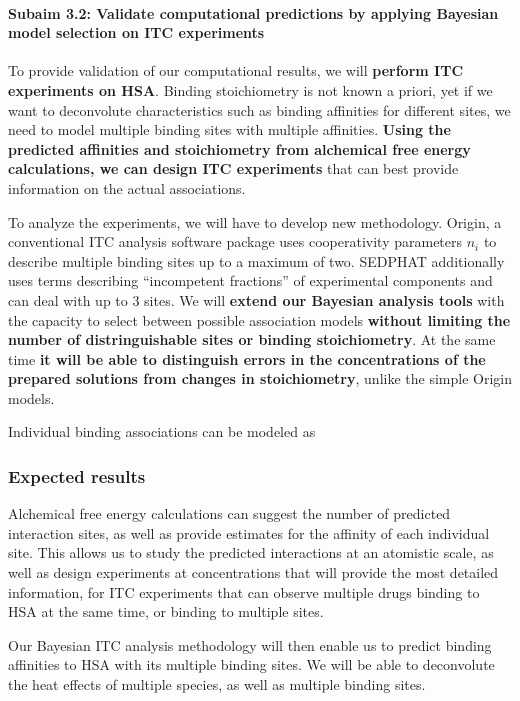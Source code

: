 \documentclass[10pt,final]{article}
\newcommand{\subsubsubsection}[1]{\paragraph*{#1}}
\begin{document}
\subsubsubsection{Subaim 3.2: Validate computational predictions by applying Bayesian model selection on ITC  experiments}
To provide validation of our computational results, we will \textbf{perform ITC experiments on HSA}. Binding stoichiometry is not known a priori, yet if we want to deconvolute characteristics such as binding affinities for different sites, we need to model multiple binding sites with multiple affinities. \textbf{Using the predicted affinities and stoichiometry from alchemical free energy calculations, we can design ITC experiments} that can best provide information on the actual associations. 

To analyze the experiments, we will have to develop new methodology. 
Origin, a conventional ITC analysis software package uses cooperativity parameters $n_i$ to describe multiple binding sites\cite{MicroCal2004a} up to a maximum of two. SEDPHAT additionally uses terms describing ``incompetent fractions'' of experimental components \cite{Houtman2007a,Zhao2015b} and can deal with up to 3 sites.
We will \textbf{extend our Bayesian analysis tools} with the capacity to select between possible association models \textbf{without limiting the number of distringuishable sites or binding stoichiometry}. At the same time \textbf{it will be able to distinguish errors in the concentrations of the prepared solutions from changes in stoichiometry}, unlike the simple Origin models. 

Individual binding associations can be modeled as

\subsubsection*{Expected results}
Alchemical free energy calculations can suggest the number of predicted interaction sites, as well as provide estimates for the affinity of each individual site.
This allows us to study the predicted interactions at an atomistic scale, as well as design experiments at concentrations that will provide the most detailed information, for ITC experiments that can observe multiple drugs binding to HSA at the same time, or binding to multiple sites.

Our Bayesian ITC analysis methodology will then enable us to predict binding affinities to HSA with its multiple binding sites. We will be able to deconvolute the heat effects of multiple species, as well as multiple binding sites.
\end{document}

